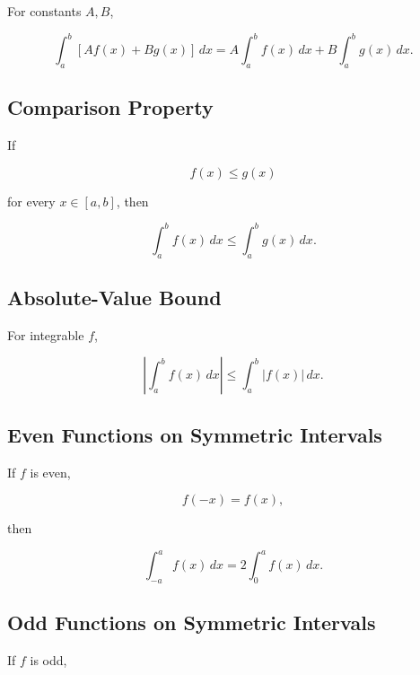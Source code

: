 For constants \(A,B\),

\[
\boxed{
\int_a^b
[Af(x)+Bg(x)]
\,dx
=
A\int_a^b f(x)\,dx
+
B\int_a^b g(x)\,dx.
}
\]

\subsection{Comparison Property}
\label{subsec:definite-integral-comparison}

If

\[
f(x)\leq g(x)
\]

for every \(x\in[a,b]\), then

\[
\boxed{
\int_a^b f(x)\,dx
\leq
\int_a^b g(x)\,dx.
}
\]

\subsection{Absolute-Value Bound}
\label{subsec:integral-absolute-value-bound}

For integrable \(f\),

\[
\boxed{
\left|
\int_a^b f(x)\,dx
\right|
\leq
\int_a^b |f(x)|\,dx.
}
\]

\subsection{Even Functions on Symmetric Intervals}
\label{subsec:even-function-integral-symmetry}

If \(f\) is even,

\[
f(-x)=f(x),
\]

then

\[
\boxed{
\int_{-a}^{a}
f(x)\,dx
=
2
\int_0^a
f(x)\,dx.
}
\]

\subsection{Odd Functions on Symmetric Intervals}
\label{subsec:odd-function-integral-symmetry}

If \(f\) is odd,

